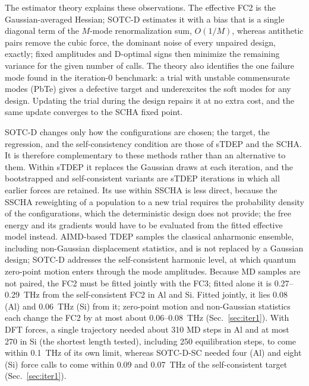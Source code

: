 \documentclass[aip,jap,reprint,amsmath,amssymb,floatfix]{revtex4-2}
\begin{document}
The estimator theory explains these observations. The effective FC2 is the
Gaussian-averaged Hessian; SOTC-D estimates it with a bias that is a single
diagonal term of the $M$-mode renormalization sum, $O(1/M)$, whereas
antithetic pairs remove the cubic force, the dominant noise of every
unpaired design, exactly; fixed amplitudes and D-optimal signs then
minimize the remaining variance for the given number of calls. The theory
also identifies the one failure mode found in the iteration-0 benchmark: a
trial with unstable commensurate modes (PbTe) gives a defective target and
underexcites the soft modes for any design. Updating the trial during the
design repairs it at no extra cost, and the same update converges to the
SCHA fixed point.

SOTC-D changes only how the configurations are chosen; the target, the
regression, and the self-consistency condition are those of sTDEP and the
SCHA. It is therefore complementary to these methods rather than an
alternative to them. Within sTDEP it replaces the Gaussian draws at each
iteration, and the bootstrapped and self-consistent variants are sTDEP
iterations in which all earlier forces are retained. Its use within SSCHA is
less direct, because the SSCHA reweighting of a population to a new trial
requires the probability density of the configurations, which the
deterministic design does not provide; the free energy and its gradients
would have to be evaluated from the fitted effective model instead. AIMD-based
TDEP samples the classical anharmonic ensemble, including non-Gaussian
displacement statistics, and is not replaced by a Gaussian design; SOTC-D
addresses the self-consistent harmonic level, at which quantum zero-point
motion enters through the mode amplitudes. Because MD samples are not
paired, the FC2 must be fitted jointly with the FC3; fitted alone it is
0.27--0.29~THz from the self-consistent FC2 in Al and Si. Fitted jointly, it
lies 0.08 (Al) and 0.06~THz (Si) from it; zero-point motion and
non-Gaussian statistics each change the FC2 by at most about 0.06--0.08~THz
(Sec.~\ref{sec:iter1}). With DFT forces, a single trajectory needed
about 310 MD steps in Al and at most 270 in Si (the shortest length
tested), including 250 equilibration steps, to come within 0.1~THz of its
own limit, whereas SOTC-D-SC needed four (Al)
and eight (Si) force calls to come within 0.09 and 0.07~THz of the
self-consistent target (Sec.~\ref{sec:iter1}).
\end{document}
